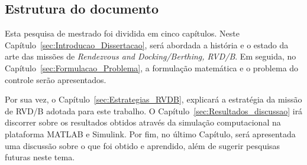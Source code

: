 \subsection{Estrutura do documento}

Esta pesquisa de mestrado foi dividida em cinco capítulos.
Neste Capítulo~\ref{sec:Introducao_Dissertacao}, será abordada a história e o estado da arte das missões de \emph{Rendezvous and Docking/Berthing, RVD/B}.
Em seguida, no Capítulo~\ref{sec:Formulacao_Problema}, a formulação matemática e o problema do controle serão apresentados.

Por sua vez, o Capítulo~\ref{sec:Estrategias_RVDB}, explicará a estratégia da missão de RVD/B adotada para este trabalho.
O Capítulo~\ref{sec:Resultados_discussao} irá discorrer sobre os resultados obtidos através da simulação computacional na plataforma MATLAB e Simulink.
Por fim, no último Capítulo, será apresentada uma discussão sobre o que foi obtido e aprendido, além de sugerir pesquisas futuras neste tema.
